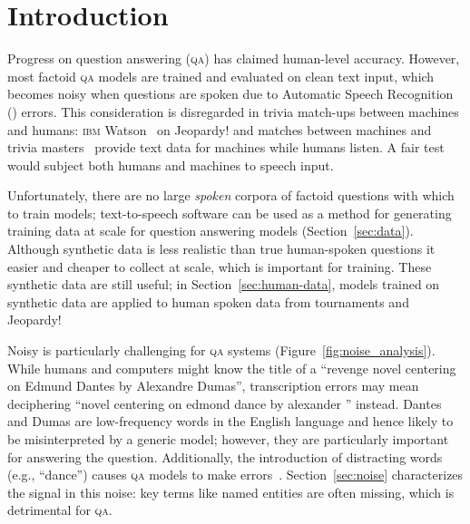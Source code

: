 \section{Introduction}
\label{sec:introduction}


Progress on question answering (\textsc{qa}) has claimed
 human-level accuracy.  However, most factoid \textsc{qa}
models are trained and evaluated on clean text input, which becomes
noisy when questions are spoken due to Automatic Speech Recognition
(\asr{}) errors.
This consideration is disregarded in trivia match-ups between machines
and humans: \textsc{ibm} Watson~\cite{Ferrucci10watson} on Jeopardy!
and \qb{} matches between machines and trivia
masters~\cite{Boyd-Graber:Feng:Rodriguez-2018} provide text data for
machines while humans listen.  A fair test would subject both humans
and machines to speech input.

Unfortunately, there are no large \textit{spoken} corpora of factoid
questions with which to train models; text-to-speech software can be used as a method for generating training data at scale for question answering models (Section~\ref{sec:data}).
Although synthetic data is less realistic than true human-spoken
questions it easier and cheaper to collect at scale, which is
important for training.  
These synthetic data are still useful; in
Section~\ref{sec:human-data}, models trained on synthetic data are
applied to human spoken data from \qb{} tournaments and Jeopardy!

Noisy \asr{} is particularly challenging for \textsc{qa} systems
(Figure~\ref{fig:noise_analysis}).
While humans and computers might know the title of a ``revenge novel
centering on Edmund Dantes by Alexandre Dumas'', transcription errors
may mean deciphering ``novel centering on edmond dance by alexander
\unk{}'' instead.   Dantes and Dumas are low-frequency words in the English language and hence likely to be misinterpreted by a generic \asr{} model; however, they are particularly important for answering the question.  Additionally, the introduction of distracting words (e.g., ``dance'') causes \textsc{qa} models to make errors~\cite{jia-liang-2017-adversarial}.
Section~\ref{sec:noise} characterizes the signal in this noise: key
terms like named entities are often missing, which is
detrimental for \textsc{qa}.


